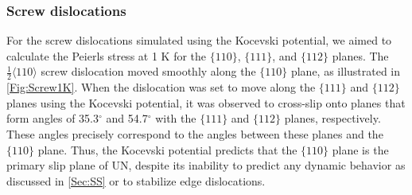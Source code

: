 \documentclass[applsci,article,submit,pdftex,moreauthors]{Definitions/mdpi}
\newcommand{\?}{\stackrel{?}{=}}
\begin{document}
\subsubsection{Screw dislocations}

For the screw dislocations simulated using the Kocevski potential, we aimed to calculate the Peierls stress at 1 K for the $\{110\}$, $\{111\}$, and $\{112\}$ planes. The $\frac{1}{2} \langle 110 \rangle$ screw dislocation moved smoothly along the $\{110\}$ plane, as illustrated in \cref{Fig:Screw1K}. When the dislocation was set to move along the $\{111\}$ and $\{112\}$ planes using the Kocevski potential, it was observed to cross-slip onto planes that form angles of 35.3$^\circ$ and 54.7$^\circ$ with the $\{111\}$ and $\{112\}$ planes, respectively. These angles precisely correspond to the angles between these planes and the $\{110\}$ plane. Thus, the Kocevski potential predicts that the $\{110\}$ plane is the primary slip plane of UN, despite its inability to predict any dynamic behavior as discussed in \cref{Sec:SS} or to stabilize edge dislocations.

\end{document}
